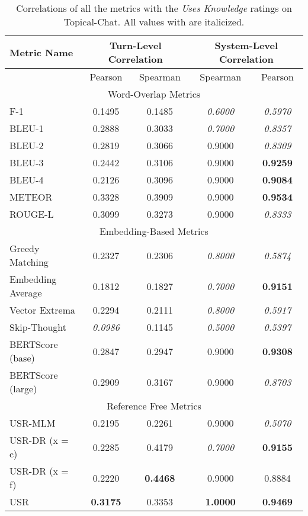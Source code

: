 \documentclass[11pt,a4paper]{article}
\begin{document}
\begin{table*}
    \centering
    \renewcommand*{\arraystretch}{1.2}
    \begin{tabular}{|l|c|c|c|c|}
    \hline
        \textbf{Metric Name} & \multicolumn{2}{|c|}{\textbf{Turn-Level Correlation}} & \multicolumn{2}{|c|}{\textbf{System-Level Correlation}}  \\ \hline
         & Pearson & Spearman & Spearman & Pearson \\ \hline
         \multicolumn{5}{|c|}{Word-Overlap Metrics} \\ \hline
F-1 & 0.1495 & 0.1485 & \textit{0.6000} & \textit{0.5970} \\
BLEU-1 & 0.2888 & 0.3033 & \textit{0.7000} & \textit{0.8357} \\
BLEU-2 & 0.2819 & 0.3066 & 0.9000 & \textit{0.8309} \\
BLEU-3 & 0.2442 & 0.3106 & 0.9000 & \textbf{0.9259} \\
BLEU-4 & 0.2126 & 0.3096 & 0.9000 & \textbf{0.9084} \\
METEOR & 0.3328 & 0.3909 & 0.9000 & \textbf{0.9534} \\
ROUGE-L & 0.3099 & 0.3273 & 0.9000 & \textit{0.8333} \\  \hline
\multicolumn{5}{|c|}{Embedding-Based Metrics} \\ \hline
Greedy Matching & 0.2327 & 0.2306 & \textit{0.8000} & \textit{0.5874} \\
Embedding Average & 0.1812 & 0.1827 & \textit{0.7000} & \textbf{0.9151} \\
Vector Extrema & 0.2294 & 0.2111 & \textit{0.8000} & \textit{0.5917} \\
Skip-Thought & \textit{0.0986} & 0.1145 & \textit{0.5000} & \textit{0.5397} \\
BERTScore (base) & 0.2847 & 0.2947 & 0.9000 & \textbf{0.9308} \\
BERTScore (large) & 0.2909 & 0.3167 & 0.9000 & \textit{0.8703} \\ \hline
\multicolumn{5}{|c|}{Reference Free Metrics} \\ \hline
USR-MLM & 0.2195 & 0.2261 & 0.9000 & \textit{0.5070} \\
USR-DR (x = c) & 0.2285 & 0.4179 & \textit{0.7000} & \textbf{0.9155} \\
USR-DR (x = f) & 0.2220 & \textbf{0.4468} & 0.9000 & 0.8884 \\
USR & \textbf{0.3175} & 0.3353 & \textbf{1.0000} & \textbf{0.9469} \\ \hline
    \end{tabular}
    \caption{Correlations of all the metrics with the \textit{Uses Knowledge} ratings on Topical-Chat. All values with  are italicized.}
    
\end{table*}
\end{document}
